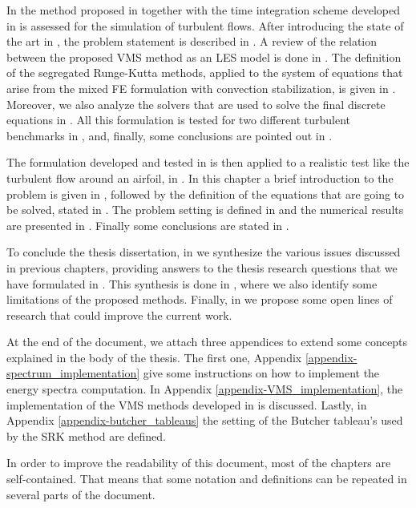In  the method proposed in  together with the time integration scheme developed in  is assessed for the simulation of turbulent flows. After introducing the state of the art in , the problem statement is described in . A review of the relation between the proposed VMS method as an LES model is done in . The definition of the segregated Runge-Kutta methods, applied to the system of equations that arise from the mixed FE formulation with convection stabilization, is given in . Moreover, we also analyze the solvers that are used to solve the final discrete equations in . All this formulation is tested for two different turbulent benchmarks in , and, finally, some conclusions are pointed out in .

The formulation developed and tested in  is then applied to a realistic test like the turbulent flow around an airfoil, in . In this chapter a brief introduction to the problem is given in , followed by the definition of the equations that are going to be solved, stated in . The problem setting is defined in  and the numerical results are presented in . Finally some conclusions are stated in .

To conclude the thesis dissertation, in  we synthesize the various issues discussed in previous chapters, providing answers to the thesis research questions that we have formulated in . This synthesis is done in , where we also identify some limitations of the proposed methods. Finally, in  we propose some open lines of research that could improve the current work.

At the end of the document, we attach three appendices to extend some concepts explained in the body of the thesis. The first one, Appendix \ref{appendix-spectrum_implementation} give some instructions on how to implement the energy spectra computation. In Appendix \ref{appendix-VMS_implementation}, the implementation of the VMS methods developed in  is discussed. Lastly, in Appendix \ref{appendix-butcher_tableaus} the setting of the Butcher tableau's used by the SRK method are defined.

In order to improve the readability of this document, most of the chapters are self-contained. That means that some notation and definitions can be repeated in several parts of the document.